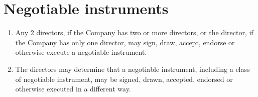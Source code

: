 \section{Negotiable instruments}

\begin{enumerate}[label=(\alph*)]
    \item Any 2 directors, if the Company has two or more directors, or the director, if the Company has only one director, may sign, draw, accept, endorse or otherwise execute a negotiable instrument.
    
    \item The directors may determine that a negotiable instrument, including a class of negotiable instrument, may be signed, drawn, accepted, endorsed or otherwise executed in a different way.
\end{enumerate} 